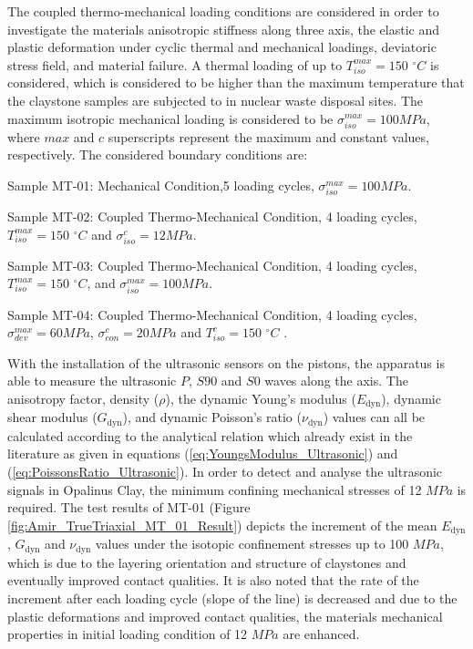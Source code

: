 The coupled thermo-mechanical loading conditions are considered in order to investigate the materials anisotropic stiffness along three axis, the elastic and plastic deformation under cyclic thermal and mechanical loadings, deviatoric stress field, and material failure. A thermal loading of up to $T_{iso}^{max}=150$ $^{\circ}C$ is considered, which is considered to be higher than the maximum temperature that the claystone samples are subjected to in nuclear waste disposal sites. The maximum isotropic mechanical loading is considered to be $\sigma_{iso}^{max}=100 MPa$, where $max$ and $c$ superscripts represent the maximum and constant values, respectively. The considered boundary conditions are:

\begin{list}{-}{\leftmargin=1em \itemindent=0em \itemsep=0em}
  \item Sample MT-01: Mechanical Condition,5 loading cycles, $\sigma_{iso}^{max}=100 MPa$.
  \item Sample MT-02: Coupled Thermo-Mechanical Condition, 4 loading cycles, $T_{iso}^{max}=150$ $^{\circ}C$ and $\sigma_{iso}^{c}=12 MPa$.
  \item Sample MT-03: Coupled Thermo-Mechanical Condition, 4 loading cycles, $T_{iso}^{max}=150$ $^{\circ}C$, and $\sigma_{iso}^{max}=100 MPa$.
  \item Sample MT-04: Coupled Thermo-Mechanical Condition, 4 loading cycles, $\sigma_{dev}^{max}=60 MPa$, $\sigma_{con}^{c}= 20 MPa$ and $T_{iso}^{c}=150$ $^{\circ}C$ .
\end{list}

With the installation of the ultrasonic sensors on the pistons, the apparatus is able to measure the ultrasonic $P$, $S90$ and $S0$ waves along the axis. The anisotropy factor, density ($\rho$), the dynamic Young’s modulus ($E_\text{dyn}$), dynamic shear modulus ($G_\text{dyn}$), and dynamic Poisson’s ratio ($\nu_\text{dyn}$) values can all be calculated according to the analytical relation which already exist in the literature \cite{Motraetal2018} as given in equations (\ref{eq:YoungsModulus_Ultrasonic}) and (\ref{eq:PoissonsRatio_Ultrasonic}). In order to detect and analyse the ultrasonic signals in Opalinus Clay, the minimum confining mechanical stresses of 12 $MPa$ is required. The test results of MT-01 (Figure \ref{fig:Amir_TrueTriaxial_MT_01_Result}) depicts the increment of the mean $E_\text{dyn}$, $G_\text{dyn}$ and $\nu_\text{dyn}$ values under the isotopic confinement stresses up to 100 $MPa$, which is due to the layering orientation and structure of claystones and eventually improved contact qualities. It is also noted that the rate of the increment after each loading cycle (slope of the line) is decreased and due to the plastic deformations and improved contact qualities, the materials mechanical properties in initial loading condition of 12 $MPa$ are enhanced. 

